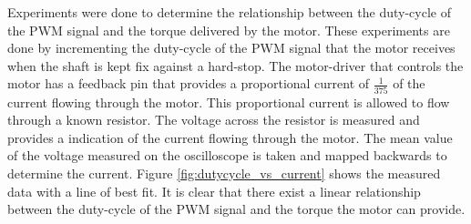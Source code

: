 Experiments were done to determine the relationship between the duty-cycle of the PWM signal and the torque delivered by the motor. These experiments are done by incrementing the duty-cycle of the PWM signal that the motor receives when the shaft is kept fix against a hard-stop. The motor-driver that controls the motor has a feedback pin that provides a proportional current of $\frac{1}{375}$ of the current flowing through the motor. This proportional current is allowed to flow through a known resistor. The voltage across the resistor is measured and provides a indication of the current flowing through the motor. The mean value of the voltage measured on the oscilloscope is taken and mapped backwards to determine the current. Figure \ref{fig:dutycycle_vs_current} shows the measured data with a line of best fit. It is clear that there exist a linear relationship between the duty-cycle of the PWM signal and the torque the motor can provide.